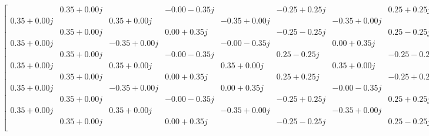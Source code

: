 \begin{gather*}
\begin{bmatrix}
            & 0.35+0.00j &            &-0.00-0.35j &            &-0.25+0.25j &            & 0.25+0.25j &            & 0.14+0.33j &            & 0.33-0.14j &            &-0.33-0.14j &            &-0.14+0.33j \\
 0.35+0.00j &            & 0.35+0.00j &            &-0.35+0.00j &            &-0.35+0.00j &            & 0.00+0.35j &            & 0.00+0.35j &            &-0.00-0.35j &            &-0.00-0.35j &            \\
            & 0.35+0.00j &            & 0.00+0.35j &            &-0.25-0.25j &            & 0.25-0.25j &            &-0.14+0.33j &            &-0.33-0.14j &            & 0.33-0.14j &            & 0.14+0.33j \\
 0.35+0.00j &            &-0.35+0.00j &            &-0.00-0.35j &            & 0.00+0.35j &            &-0.25+0.25j &            & 0.25-0.25j &            & 0.25+0.25j &            &-0.25-0.25j &            \\
            & 0.35+0.00j &            &-0.00-0.35j &            & 0.25-0.25j &            &-0.25-0.25j &            &-0.33+0.14j &            & 0.14+0.33j &            &-0.14+0.33j &            & 0.33+0.14j \\
 0.35+0.00j &            & 0.35+0.00j &            & 0.35+0.00j &            & 0.35+0.00j &            &-0.35+0.00j &            &-0.35+0.00j &            &-0.35+0.00j &            &-0.35+0.00j &            \\
            & 0.35+0.00j &            & 0.00+0.35j &            & 0.25+0.25j &            &-0.25+0.25j &            &-0.33-0.14j &            & 0.14-0.33j &            &-0.14-0.33j &            & 0.33-0.14j \\
 0.35+0.00j &            &-0.35+0.00j &            & 0.00+0.35j &            &-0.00-0.35j &            &-0.25-0.25j &            & 0.25+0.25j &            & 0.25-0.25j &            &-0.25+0.25j &            \\
            & 0.35+0.00j &            &-0.00-0.35j &            &-0.25+0.25j &            & 0.25+0.25j &            &-0.14-0.33j &            &-0.33+0.14j &            & 0.33+0.14j &            & 0.14-0.33j \\
 0.35+0.00j &            & 0.35+0.00j &            &-0.35+0.00j &            &-0.35+0.00j &            &-0.00-0.35j &            &-0.00-0.35j &            & 0.00+0.35j &            & 0.00+0.35j &            \\
            & 0.35+0.00j &            & 0.00+0.35j &            &-0.25-0.25j &            & 0.25-0.25j &            & 0.14-0.33j &            & 0.33+0.14j &            &-0.33+0.14j &            &-0.14-0.33j \\

\end{bmatrix}
\end{gather*}
